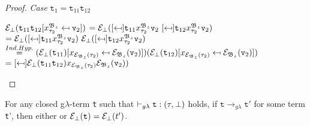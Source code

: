 \begin{proof}
\noindent\textit{Case} 
$\texttt{t}_{1} = \texttt{t}_{11}\texttt{t}_{12} $
\begin{center}
 $\mathcal{E}_{\bot}
	(\texttt{t}_{11}\texttt{t}_{12} [x^{\mathfrak{B_{2}}}_{\tau_{2}} \mapsfrom \texttt{v}_{2}]) 	$ 
$	= \e_{\bot}
	(\sbst
		{\texttt{t}_{11}}
		{x^{\mathfrak{B_{2}}}_{\tau_{2}}}
		{\texttt{v}_{2}} ~
	\sbst
		{\texttt{t}_{12}}
		{x^{\mathfrak{B_{2}}}_{\tau_{2}}}
		{\texttt{v}_{2}}) 	  $ \\[0.08cm]
$ = \e_{\bot}
	(\sbst
		{\texttt{t}_{11}}
		{x^{\mathfrak{B_{2}}}_{\tau_{2}}}
		{\texttt{v}_{2}}) ~
	\e_{\bot}
	(\sbst
		{\texttt{t}_{12}}
		{x^{\mathfrak{B_{2}}}_{\tau_{2}}}
		{\texttt{v}_{2}}) 	  $ \\[0.08cm]
$ \stackrel{Ind.Hyp.}{=} 
		(\mathcal{E}_{\bot}({\texttt{t}_{11}}) [x_{\mathcal{E}_{\mathfrak{B_{2}}}(\tau_{2})} \mapsfrom \mathcal{E}_{\mathfrak{B_{2}}}(\texttt{v}_{2})])	
		(\mathcal{E}_{\bot}({\texttt{t}_{12}}) [x_{\mathcal{E}_{\mathfrak{B_{2}}}(\tau_{2})} \mapsfrom \mathcal{E}_{\mathfrak{B_{2}}}(\texttt{v}_{2})])	$ \\[0.08cm]
$ = 
	\sbst
		{\e_{\bot}(\texttt{t}_{11} \texttt{t}_{12})}
		{x_{\e_{\mathfrak{B_{2}}}(\tau_{2})}}
		{\e_{\mathfrak{B_{2}}}(\texttt{v}_{2})})	$\\[0.08cm]
\end{center}
 \end{proof}



\theoremstyle{remark}

\begin{lemma}
For any closed g$\lambda$-term \texttt{t} such that
$\vdash_{g\lambda} \texttt{t} : (\tau, \bot)$ holds, 
if	$\texttt{t} \rightarrow_{g\lambda} \texttt{t}'$ 
for some term \texttt{t}', 
then either 
or 		$\mathcal{E}_{\bot}(\texttt{t}) = \mathcal{E}_{\bot}(t')$. 
\end{lemma}

